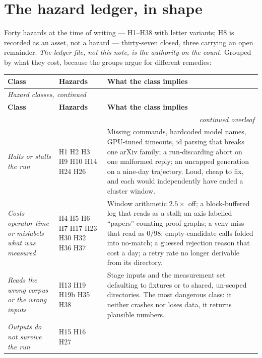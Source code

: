 \documentclass[11pt]{article}
\newcommand{\hz}[1]{\textsf{#1}}
\begin{document}
\section{The hazard ledger, in shape}
\label{sec:hazards}

Forty hazards at the time of writing --- \hz{H1}--\hz{H38} with letter
variants; \hz{H8} is recorded as an asset, not a hazard --- thirty-seven
closed, three carrying an open remainder. \emph{The ledger file, not this
note, is the authority on the count.} Grouped by what they cost, because the
groups argue for different remedies:

{\small
\begin{longtable}{p{} p{} p{}}
\toprule
\textbf{Class} & \textbf{Hazards} & \textbf{What the class implies}\\
\midrule
\endfirsthead
\multicolumn{3}{l}{\emph{\small Hazard classes, continued}}\\
\toprule
\textbf{Class} & \textbf{Hazards} & \textbf{What the class implies}\\
\midrule
\endhead
\midrule
\multicolumn{3}{r}{\emph{\small continued overleaf}}\\
\endfoot
\bottomrule
\endlastfoot
\emph{Halts or stalls the run} &
\hz{H1} \hz{H2} \hz{H3} \hz{H9} \hz{H10} \hz{H14} \hz{H24} \hz{H26} &
Missing commands, hardcoded model names, GPU-tuned timeouts, id parsing that
breaks one arXiv family; a run-discarding abort on one malformed reply; an
uncapped generation on a nine-day trajectory. Loud, cheap to fix, and each
would independently have ended a cluster window.\\[3pt]
\emph{Costs operator time or mislabels what was measured} &
\hz{H4} \hz{H5} \hz{H6} \hz{H7} \hz{H17} \hz{H23} \hz{H30} \hz{H32} \hz{H36}
\hz{H37} &
Window arithmetic $2.5\times$ off; a block-buffered log that reads as a stall;
an axis labelled ``papers'' counting proof-graphs; a venv miss that read as
$0/98$; empty-candidate calls folded into no-match; a guessed rejection reason
that cost a day; a retry rate no longer derivable from its directory.\\[3pt]
\emph{Reads the wrong corpus or the wrong inputs} &
\hz{H13} \hz{H19} \hz{H19b} \hz{H35} \hz{H38} &
Stage inputs and the measurement set defaulting to fixtures or to shared,
un-scoped directories. The most dangerous class: it neither crashes nor loses
data, it returns plausible numbers.\\[3pt]
\emph{Outputs do not survive the run} &
\hz{H15} \hz{H16} \hz{H27} &

\end{longtable}}
\end{document}
